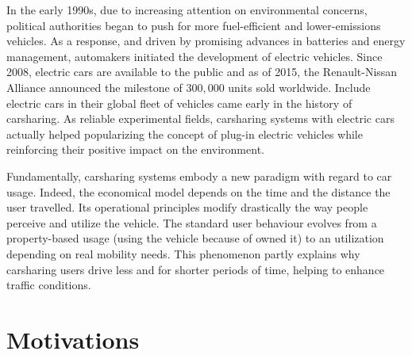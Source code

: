 \begin{bibunit}[ieeetr]
In the early 1990s, due to increasing attention on environmental concerns, political authorities began to push for more fuel-efficient and lower-emissions vehicles.
As a response, and driven by promising advances in batteries and energy management, automakers initiated the development of electric vehicles.
Since 2008, electric cars are available to the public and as of 2015, the Renault-Nissan Alliance announced the milestone of $300,000$ units sold worldwide.
Include electric cars in their global fleet of vehicles came early in the history of carsharing.
As reliable experimental fields, carsharing systems with electric cars actually helped popularizing the concept of plug-in electric vehicles while reinforcing their positive impact on the environment.

\medskip
Fundamentally, carsharing systems embody a new paradigm with regard to car usage.
Indeed, the economical model depends on the time and the distance the user travelled.
Its operational principles modify drastically the way people perceive and utilize the vehicle.
The standard user behaviour evolves from a property-based usage (\ie using the vehicle because of owned it) to an utilization depending on real mobility needs.
This phenomenon partly explains why carsharing users drive less and for shorter periods of time, helping to enhance traffic conditions.





\section{Motivations}


\end{bibunit}
